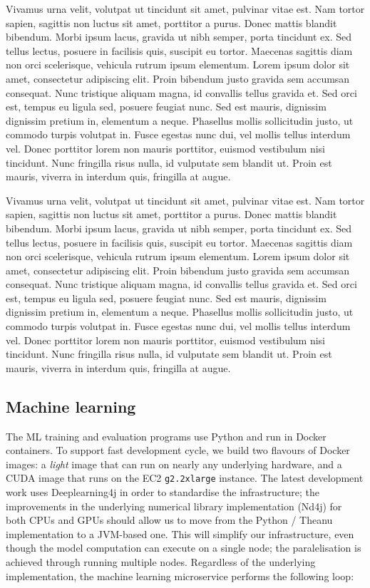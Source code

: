 \documentclass[a4paper, 10 pt, conference]{IEEEtran}
\def\lstinlinex{\lstinline[basicstyle=\itshape,keywordstyle={}]}
\begin{document}
Vivamus urna velit, volutpat ut tincidunt sit amet, pulvinar vitae est. Nam tortor sapien, sagittis non luctus sit amet, porttitor a purus. Donec mattis blandit bibendum. Morbi ipsum lacus, gravida ut nibh semper, porta tincidunt ex. Sed tellus lectus, posuere in facilisis quis, suscipit eu tortor. Maecenas sagittis diam non orci scelerisque, vehicula rutrum ipsum elementum. Lorem ipsum dolor sit amet, consectetur adipiscing elit. Proin bibendum justo gravida sem accumsan consequat. Nunc tristique aliquam magna, id convallis tellus gravida et. Sed orci est, tempus eu ligula sed, posuere feugiat nunc. Sed est mauris, dignissim dignissim pretium in, elementum a neque. Phasellus mollis sollicitudin justo, ut commodo turpis volutpat in. Fusce egestas nunc dui, vel mollis tellus interdum vel. Donec porttitor lorem non mauris porttitor, euismod vestibulum nisi tincidunt. Nunc fringilla risus nulla, id vulputate sem blandit ut. Proin est mauris, viverra in interdum quis, fringilla at augue.

Vivamus urna velit, volutpat ut tincidunt sit amet, pulvinar vitae est. Nam tortor sapien, sagittis non luctus sit amet, porttitor a purus. Donec mattis blandit bibendum. Morbi ipsum lacus, gravida ut nibh semper, porta tincidunt ex. Sed tellus lectus, posuere in facilisis quis, suscipit eu tortor. Maecenas sagittis diam non orci scelerisque, vehicula rutrum ipsum elementum. Lorem ipsum dolor sit amet, consectetur adipiscing elit. Proin bibendum justo gravida sem accumsan consequat. Nunc tristique aliquam magna, id convallis tellus gravida et. Sed orci est, tempus eu ligula sed, posuere feugiat nunc. Sed est mauris, dignissim dignissim pretium in, elementum a neque. Phasellus mollis sollicitudin justo, ut commodo turpis volutpat in. Fusce egestas nunc dui, vel mollis tellus interdum vel. Donec porttitor lorem non mauris porttitor, euismod vestibulum nisi tincidunt. Nunc fringilla risus nulla, id vulputate sem blandit ut. Proin est mauris, viverra in interdum quis, fringilla at augue.

\subsection{Machine learning}

The ML training and evaluation programs use Python and run in Docker containers. To support fast development cycle, we build two flavours of Docker images: a \emph{light} image that can run on nearly any underlying hardware, and a CUDA \cite{cuda} image that runs on the EC2 \lstinlinex{g2.2xlarge} instance. The latest development work uses Deeplearning4j \cite{dl4j} in order to standardise the infrastructure; the improvements in the underlying numerical library implementation (Nd4j) for both CPUs and GPUs should allow us to move from the Python / Theanu implementation to a JVM-based one. This will simplify our infrastructure, even though the model computation can execute on a single node; the paralelisation is achieved through running multiple nodes. Regardless of the underlying implementation, the machine learning microservice performs the following loop:
\end{document}
